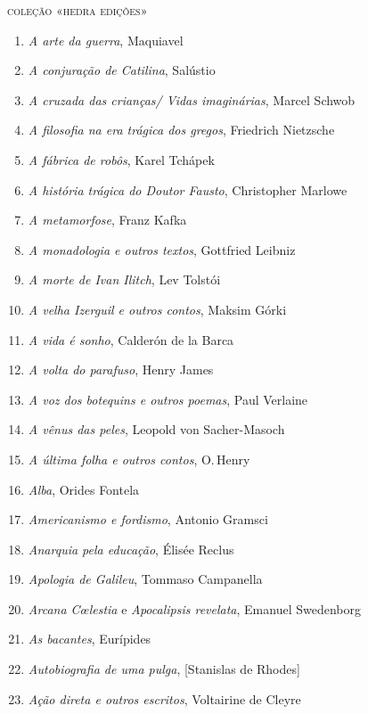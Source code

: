 \pagebreak
\blankpage
\pagestyle{empty}
\begingroup
\fontsize{7}{8}\selectfont

{\large\textsc{coleção «hedra edições»}}

\begin{enumerate}
\setlength\parskip{4.2pt}
\setlength\itemsep{-1.4mm}
\item \textit{A arte da guerra}, Maquiavel
\item \textit{A conjuração de Catilina}, Salústio
\item \textit{A cruzada das crianças/ Vidas imaginárias}, Marcel Schwob
\item \textit{A filosofia na era trágica dos gregos}, Friedrich Nietzsche
\item \textit{A fábrica de robôs}, Karel Tchápek 
\item \textit{A história trágica do Doutor Fausto}, Christopher Marlowe
\item \textit{A metamorfose}, Franz Kafka
\item \textit{A monadologia e outros textos}, Gottfried Leibniz
\item \textit{A morte de Ivan Ilitch}, Lev Tolstói 
\item \textit{A velha Izerguil e outros contos}, Maksim Górki
\item \textit{A vida é sonho}, Calderón de la Barca
\item \textit{A volta do parafuso}, Henry James
\item \textit{A voz dos botequins e outros poemas}, Paul Verlaine 
\item \textit{A vênus das peles}, Leopold von Sacher{}-Masoch
\item \textit{A última folha e outros contos}, O.\,Henry
\item \textit{Alba}, Orides Fontela
\item \textit{Americanismo e fordismo}, Antonio Gramsci
\item \textit{Anarquia pela educação}, Élisée Reclus 
\item \textit{Apologia de Galileu}, Tommaso Campanella 
\item \textit{Arcana C\oe lestia} e \textit{Apocalipsis revelata}, Emanuel Swedenborg
\item \textit{As bacantes}, Eurípides
\item \textit{Autobiografia de uma pulga}, [Stanislas de Rhodes]
\item \textit{Ação direta e outros escritos}, Voltairine de Cleyre

\end{enumerate}
